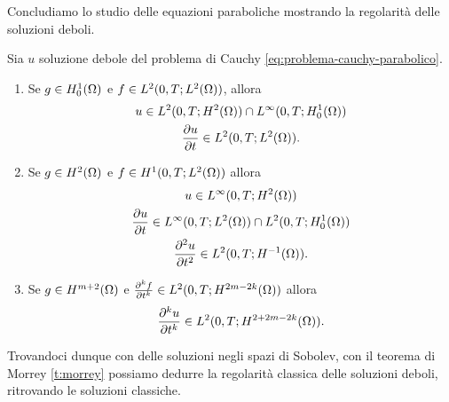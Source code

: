 Concludiamo lo studio delle equazioni paraboliche mostrando la regolarità delle soluzioni deboli.
\begin{teorema} \label{t:regolarita-soluzioni-deboli-paraboliche}
    Sia $u$ soluzione debole del problema di Cauchy \eqref{eq:problema-cauchy-parabolico}.
    \begin{enumerate}
        \item Se $g\in\sobHc[1]{\Omega}$ e $f\in\leb[2]{0,T;\leb[2]{\Omega}}$, allora
            \begin{gather*}
                u\in\leb[2]{0,T;\sobH[2]{\Omega}}\cap\leb[\infty]{0,T;\sobHc[1]{\Omega}}\\
                \drp{u}{t}\in\leb[2]{0,T;\leb[2]{\Omega}}.
            \end{gather*}
        \item Se $g\in\sobH[2]{\Omega}$ e $f\in\sobH[1]{0,T;\leb[2]{\Omega}}$ allora
            \begin{gather*}
                u\in\leb[\infty]{0,T;\sobH[2]{\Omega}}\\
                \drp{u}{t}\in\leb[\infty]{0,T;\leb[2]{\Omega}}\cap\leb[2]{0,T;\sobHc[1]{\Omega}}\\
                \ddrp{u}{t}\in\leb[2]{0,T;\sobH[-1]{\Omega}}.
            \end{gather*}
        \item Se $g\in\sobH[m+2]{\Omega}$ e $\frac{\partial^k f}{\partial t^k}\in\leb[2]{0,T;\sobH[2m-2k]{\Omega}}$ allora
            \begin{gather*}
                \frac{\partial^k u}{\partial t^k}\in\leb[2]{0,T;\sobH[2+2m-2k]{\Omega}}.
            \end{gather*}
    \end{enumerate}
\end{teorema}
Trovandoci dunque con delle soluzioni negli spazi di Sobolev, con il teorema di Morrey \ref{t:morrey} possiamo dedurre la regolarità classica delle soluzioni deboli, ritrovando le soluzioni classiche.
